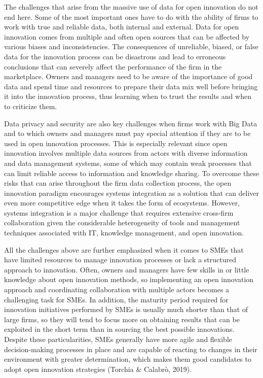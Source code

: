 \documentclass[
  letterpaper,
  DIV=11,
  numbers=noendperiod]{scrreprt}
\begin{document}
The challenges that arise from the massive use of data for open
innovation do not end here. Some of the most important ones have to do
with the ability of firms to work with true and reliable data, both
internal and external. Data for open innovation comes from multiple and
often open sources that can be affected by various biases and
inconsistencies. The consequences of unreliable, biased, or false data
for the innovation process can be disastrous and lead to erroneous
conclusions that can severely affect the performance of the firm in the
marketplace. Owners and managers need to be aware of the importance of
good data and spend time and resources to prepare their data mix well
before bringing it into the innovation process, thus learning when to
trust the results and when to criticize them.

Data privacy and security are also key challenges when firms work with
Big Data and to which owners and managers must pay special attention if
they are to be used in open innovation processes. This is especially
relevant since open innovation involves multiple data sources from
actors with diverse information and data management systems, some of
which may contain weak processes that can limit reliable access to
information and knowledge sharing. To overcome these risks that can
arise throughout the firm data collection process, the open innovation
paradigm encourages systems integration as a solution that can deliver
even more competitive edge when it takes the form of ecosystems.
However, systems integration is a major challenge that requires
extensive cross-firm collaboration given the considerable heterogeneity
of tools and management techniques associated with IT, knowledge
management, and open innovation.

All the challenges above are further emphasized when it comes to SMEs
that have limited resources to manage innovation processes or lack a
structured approach to innovation. Often, owners and managers have few
skills in or little knowledge about open innovation methods, so
implementing an open innovation approach and coordinating collaboration
with multiple actors becomes a challenging task for SMEs. In addition,
the maturity period required for innovation initiatives performed by
SMEs is usually much shorter than that of large firms, so they will tend
to focus more on obtaining results that can be exploited in the short
term than in sourcing the best possible innovations. Despite these
particularities, SMEs generally have more agile and flexible
decision-making processes in place and are capable of reacting to
changes in their environment with greater determination, which makes
them good candidates to adopt open innovation strategies (Torchia \&
Calabrò, 2019).
\end{document}
